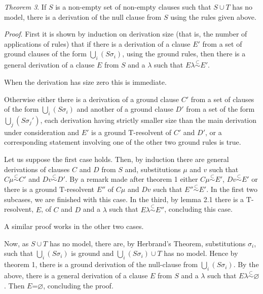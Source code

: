 \documentclass[letterpaper]{report}
\begin{document}
\noindent
\emph{Theorem 3}. If $S$ is a
non-empty set of non-empty clauses such that $S\cup T$ has no model,
there is a derivation of the null clause from $S$ using the rules
given above.

\noindent
\emph{Proof}. First it is shown by induction on derivation size (that
is, the number of applications of rules) that if there is a derivation
of a clause $E'$ from a set of ground clauses of the form
$\bigcup\limits_{i}(S\sigma_{i})$, using the ground rules, then there
is a general derivation of a clause $E$ from $S$ and a $\lambda$
such that $E\lambda\stackrel{{\subset}}{{\sim}}E'$.

When the derivation has size zero this is immediate.

Otherwise either there is a derivation of a ground clause $C'$
from a set of clauses of the form $\bigcup\limits_{i}(S\sigma_{i})$
and another of a ground clause $D'$ from a set of the form
$\bigcup\limits_{j}(S\sigma_{j}')$, each derivation having
strictly smaller size than the main derivation under consideration and
$E'$ is a ground $\mathrm{T}$-resolvent of $C'$ and
$D'$, or a corresponding statement involving one of the other
two ground rules is true.

Let us suppose the first case holds. Then, by induction there are
general derivations of clauses $C$ and $D$ from $S$ and,
substitutions $\mu$ and $v$ such that
$C\mu\stackrel{{\subset}}{{\sim}}C'$ and
$Dv\stackrel{{\subset}}{{\sim}}D'$. By a remark made
after theorem 1 either
$C\mu\stackrel{{\subset}}{{\sim}}E'$,
$Dv\stackrel{{\subset}}{{\sim}}E'$ or there is a
ground $\mathrm{T}$-resolvent $E''$ of $C\mu$ and $Dv$ such that
$E''\stackrel{{\subset}}{{\sim}}E'$. In the
first two subcases, we are finished with this case. In the third, by
lemma 2.1 there is a $\mathrm{T}$-resolvent, $E$, of $C$ and $D$ and a
$\lambda$ such that
$E\lambda\stackrel{{\subset}}{{\sim}}E''$, concluding
this case.

A similar proof works in the other two cases.

Now, as $S\cup T$ has no model, there are, by
Herbrand's Theorem, substitutions $\sigma_{i}$, such
that $\bigcup\limits_{i}(S\sigma_{i})$ is ground and
$\bigcup\limits_{i}(S\sigma_{i})\cup T$ has no model. Hence by theorem
1, there is a ground derivation of the null-clause from
$\bigcup\limits_{i}(S\sigma_{i})$. By the above, there is a general
derivation of a clause $E$ from $S$ and a $\lambda$ such that
$E\lambda\stackrel{{\subset}}{{\sim}}\varnothing$. Then
$E$=$\varnothing$, concluding the proof.
\end{document}
